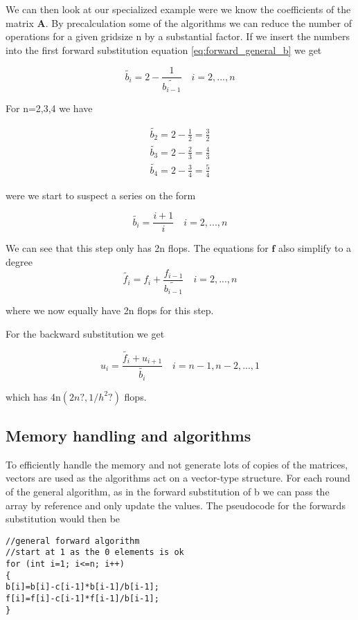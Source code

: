 \documentclass[a4paper,11pt]{article}
\begin{document}
{%


We can then look at our specialized example were we know the coefficients of the matrix $\mathbf{A}$. By precalculation some of the algorithms we can reduce the number of operations for a given gridsize n by a substantial factor. If we insert the numbers into the first forward substitution equation \ref{eq:forward_general_b} we get

\begin{equation}
	\tilde{b_i}=2-\frac{1}{\tilde{b_{i-1}}}\quad i = 2, ..., n
\end{equation}

For n=2,3,4 we have 

\begin{align}
	\tilde{b_2}=2-\frac{1}{2}=\frac{3}{2} \\
	\tilde{b_3}=2-\frac{2}{3}=\frac{4}{3} \\
	\tilde{b_4}=2-\frac{3}{4}=\frac{5}{4}
\end{align}

were we start to suspect a series on the form

\begin{equation}
	\tilde{b_i}=\frac{i+1}{i}  \quad i = 2, ..., n
	\label{eq:forward_specific_b}
\end{equation}

We can see that this step only has 2n flops. The equations for $\mathbf{f}$ also simplify to a degree
\begin{equation}
	\tilde{f_i}=f_{i}+\frac{f_{i-1}}{\tilde{b_{i-1}}}\quad i = 2, ..., n
	\label{eq:forward_specific_f}
\end{equation}

where we now equally have 2n flops for this step. 

For the backward substitution we get 

\begin{equation}
	u_i = \frac{\tilde{f_i} + u_{i+1}}{\tilde{b_i}}\quad i = n-1, n-2, ..., 1
	\label{eq:forward_specific_u}
\end{equation}

which has 4n$(2n?, 1/h^2 ?)$ flops. 

\subsection{Memory handling and algorithms}
To efficiently handle the memory and not generate lots of copies of the matrices, vectors are used as the algorithms act on a vector-type structure. For each round of the general algorithm, as in the forward substitution of b we can pass the array by reference and only update the values. The pseudocode for the forwards substitution would then be
\begin{lstlisting}
//general forward algorithm
//start at 1 as the 0 elements is ok
for (int i=1; i<=n; i++)
{
b[i]=b[i]-c[i-1]*b[i-1]/b[i-1];
f[i]=f[i]-c[i-1]*f[i-1]/b[i-1];
}
\end{lstlisting}


}
\end{document}
